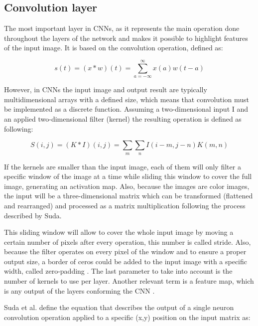\subsection{Convolution layer}

The most important layer in CNNs, as it represents the main operation done throughout the layers 
of the network and makes it possible to highlight features of the input image.
It is based on the convolution operation, defined as:

\begin{equation} \label{eq:convorig}
  s(t)
  =
  (x*w)(t)
  =
  \sum_{a=-\infty}^{\infty} x(a)w(t-a)
\end{equation}

However, in CNNs the input image and output result are typically multidimensional
arrays with a defined size, which means that convolution must be implemented
as a discrete function. Assuming a two-dimensional input I and an applied two-dimensional filter (kernel)
the resulting operation is defined as following:

\begin{equation} \label{eq:convdiscr}
  S(i,j)
  =
  (K*I)(i,j)
  =
  \sum_{m}\sum_{n} I(i-m,j-n)K(m,n)
\end{equation}

If the kernels are smaller than the input image, each of them will only filter a 
specific window of the image at a time
while sliding this window to cover the full image, generating an activation map. 
Also, because the images are color images,
the input will be a three-dimensional matrix which can be transformed (flattened 
and rearranged) and processed as a matrix multiplication
following the process described by Suda\cite{suda}.

This sliding window will allow to cover the whole input image by moving a certain number of pixels after every operation, this number is called stride.
Also, because the filter operates on every pixel of the window and to ensure a proper output size, a border of ceros could be added to the input
image with a specific width, called zero-padding \cite{karpathy2016cs231n}. The last parameter to take into account is the number of kernels to use per layer.
Another relevant term is a feature map, which is any output of the layers conforming the CNN \cite{Goodfellow-et-al-2016}.

Suda et al. define the equation that describes the output of a single neuron convolution operation applied to a specific (x,y) position on 
the input matrix as:

